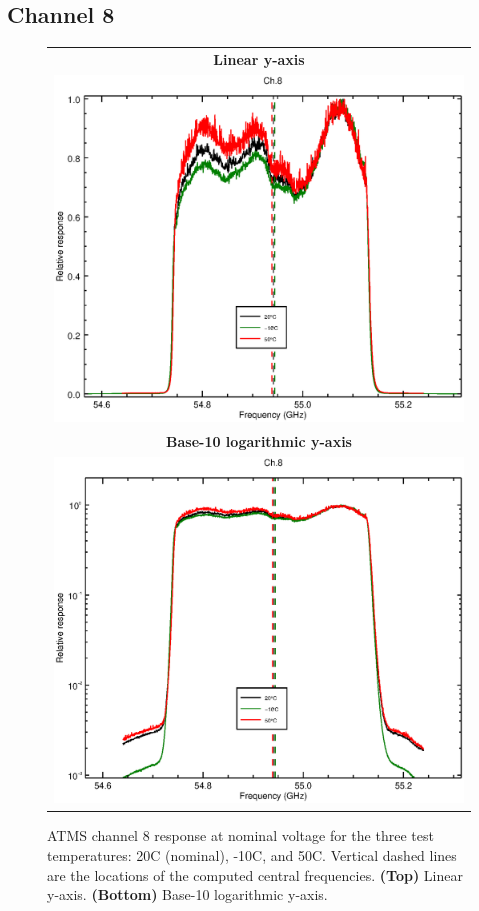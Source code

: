 \subsection{Channel 8}
\begin{figure}[H]
  \label{fig:Tset.ch8_response}
  \centering
  \begin{tabular}{c}
    \hspace{1.75cm}\sffamily\textbf{Linear y-axis} \\
    \includegraphics[scale=0.55]{graphics/srf/Tset/lin/atms_npp-8.eps} \\
    \hspace{1.75cm}\sffamily\textbf{Base-10 logarithmic y-axis} \\
    \includegraphics[scale=0.55]{graphics/srf/Tset/log/atms_npp-8.eps}
  \end{tabular}
  \caption{ATMS channel 8 response at nominal voltage for the three test temperatures: 20\textdegree{}C (nominal), -10\textdegree{}C, and 50\textdegree{}C. Vertical dashed lines are the locations of the computed central frequencies. \textbf{(Top)} Linear y-axis. \textbf{(Bottom)} Base-10 logarithmic y-axis.}
\end{figure}

